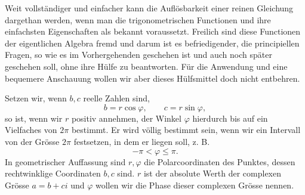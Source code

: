 \documentclass[11pt]{article}
\begin{document}
Weit vollständiger und einfacher kann die Auflösbarkeit einer reinen Gleichung dargethan werden, wenn man die trigonometrischen Functionen und ihre einfachsten Eigenschaften als bekannt voraussetzt. Freilich sind diese Functionen der eigentlichen Algebra fremd und darum ist es befriedigender, die principiellen Fragen, so wie es im Vorhergehenden geschehen ist und auch noch später geschehen soll, ohne ihre Hülfe zu beantworten. Für die Anwendung und eine bequemere Anschauung wollen wir aber dieses Hülfsmittel doch nicht entbehren.

Setzen wir, wenn $b,c$ reelle Zahlen sind,
\begin{equation}
 b=r\cos\varphi,\qquad c=r\sin\varphi,
\tag{1}
\end{equation}
so ist, wenn wir $r$ positiv annehmen, der Winkel $\varphi$ hierdurch bis auf ein Vielfaches von $2\pi$ bestimmt. Er wird völlig bestimmt sein, wenn wir ein Intervall von der Grösse $2\pi$ festsetzen, in dem er liegen soll, z. B.
\[
 -\pi<\varphi\le \pi.
\]
In geometrischer Auffassung sind $r,\varphi$ die Polarcoordinaten des Punktes, dessen rechtwinklige Coordinaten $b,c$ sind. $r$ ist der absolute Werth der complexen Grösse $a=b+ci$ und $\varphi$ wollen wir die Phase dieser complexen Grösse nennen.
\end{document}
